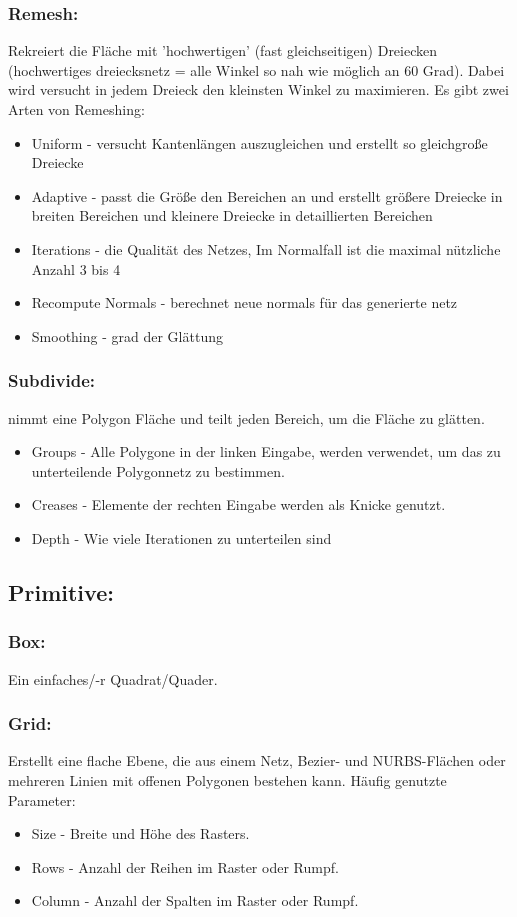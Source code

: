 \documentclass[paper=a4,fontsize=12pt,ngerman]{scrartcl}
\begin{document}
	\subsubsection*{Remesh:}
	Rekreiert die Fläche mit 'hochwertigen' (fast gleichseitigen) Dreiecken (hochwertiges dreiecksnetz = alle Winkel so nah wie möglich an 60 Grad). Dabei wird versucht in jedem Dreieck den kleinsten Winkel zu maximieren.
	Es gibt zwei Arten von Remeshing:
	\begin{itemize}
		\item Uniform - versucht Kantenlängen auszugleichen und erstellt so gleichgroße Dreiecke
		\item Adaptive - passt die Größe den Bereichen an und erstellt größere Dreiecke in breiten Bereichen und kleinere Dreiecke in detaillierten Bereichen
	\end{itemize}
	\begin{itemize}
		\item Iterations - die Qualität des Netzes, Im Normalfall ist die maximal nützliche Anzahl 3 bis 4
		\item Recompute Normals - berechnet neue normals für das generierte netz
		\item Smoothing - grad der Glättung
	\end{itemize}
	
	\subsubsection*{Subdivide:}
	nimmt eine Polygon Fläche und teilt jeden Bereich, um die Fläche zu glätten.
	\begin{itemize}
		\item Groups - Alle Polygone in der linken Eingabe, werden verwendet, um das zu unterteilende Polygonnetz zu bestimmen.
		\item Creases - Elemente der rechten Eingabe werden als Knicke genutzt.
		\item Depth - Wie viele Iterationen zu unterteilen sind
	\end{itemize}
	
	\subsection*{Primitive:}
	\subsubsection*{Box:}
	Ein einfaches/-r Quadrat/Quader.
	\subsubsection*{Grid:}
	Erstellt eine flache Ebene, die aus einem Netz, Bezier- und NURBS-Flächen oder mehreren Linien mit offenen Polygonen bestehen kann. Häufig genutzte Parameter:
		\begin{itemize}
			\item Size - Breite und Höhe des Rasters.
			\item Rows - Anzahl der Reihen im Raster oder Rumpf. 
			\item Column - Anzahl der Spalten im Raster oder Rumpf.
		\end{itemize}
\end{document}
